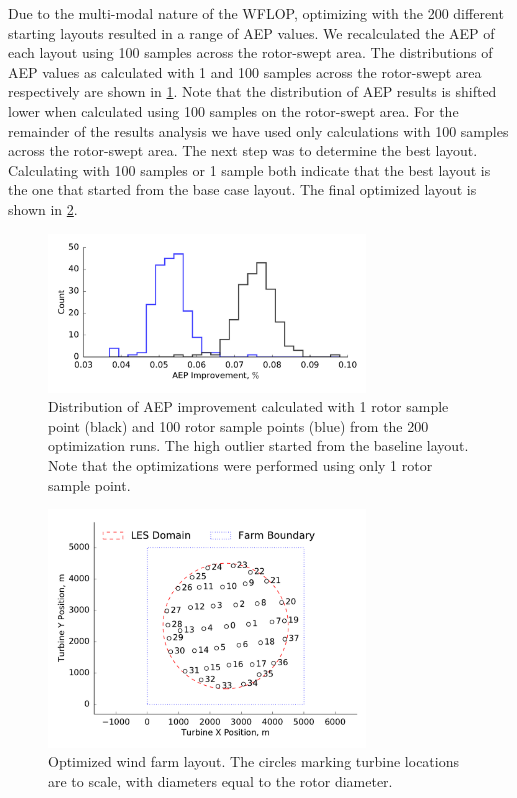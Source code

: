 \documentclass[conf]{new-aiaa}
\begin{document}
Due to the multi-modal nature of the WFLOP, optimizing with the 200 different starting layouts resulted in a range of AEP values. We recalculated the AEP of each layout using 100 samples across the rotor-swept area. The distributions of AEP values as calculated with 1 and 100 samples across the rotor-swept area respectively are shown in \cref{fig:opt-distribution}. Note that the distribution of AEP results is shifted lower when calculated using 100 samples on the rotor-swept area. For the remainder of the results analysis we have used only calculations with 100 samples across the rotor-swept area. The next step was to determine the best layout. Calculating with 100 samples or 1 sample both indicate that the best layout is the one that started from the base case layout. The final optimized layout is shown in \cref{fig:optimized-layout}.
%
\begin{figure}[htpb!]
	\centering
	\includegraphics[width=0.75\textwidth]{final_images/38turbs_results_hist_aep.pdf}
	\caption{Distribution of AEP improvement calculated with 1 rotor sample point (black) and 100 rotor sample points (blue) from the 200 optimization runs. The high outlier started from the baseline layout. Note that the optimizations were performed using only 1 rotor sample point.}
	\label{fig:opt-distribution}
\end{figure}
%
\begin{figure}[htpb!]
	\centering
	\includegraphics[width=0.75\textwidth]{final_images/round_farm_38Turbines_5DSpacing_finish.pdf}
	\caption{Optimized wind farm layout. The circles marking turbine locations are to scale, with diameters equal to the rotor diameter.}
	\label{fig:optimized-layout}
\end{figure}
\end{document}
